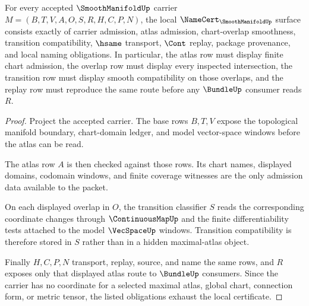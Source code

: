 \begin{theorem}
\label{thm:smoothmanifold-namecert-obligations}
For every accepted $\SmoothManifoldUp$ carrier $M=(B,T,V,A,O,S,R,H,C,P,N)$, the local $\NameCert_{\SmoothManifoldUp}$ surface consists exactly of carrier admission, atlas admission, chart-overlap smoothness, transition compatibility, $\hsame$ transport, $\Cont$ replay, package provenance, and local naming obligations. In particular, the atlas row must display finite chart admission, the overlap row must display every inspected intersection, the transition row must display smooth compatibility on those overlaps, and the replay row must reproduce the same route before any $\BundleUp$ consumer reads $R$.
\end{theorem}
\begin{proof}
Project the accepted carrier. The base rows $B,T,V$ expose the topological manifold boundary, chart-domain ledger, and model vector-space windows before the atlas can be read.

The atlas row $A$ is then checked against those rows. Its chart names, displayed domains, codomain windows, and finite coverage witnesses are the only admission data available to the packet.

On each displayed overlap in $O$, the transition classifier $S$ reads the corresponding coordinate changes through $\ContinuousMapUp$ and the finite differentiability tests attached to the model $\VecSpaceUp$ windows. Transition compatibility is therefore stored in $S$ rather than in a hidden maximal-atlas object.

Finally $H,C,P,N$ transport, replay, source, and name the same rows, and $R$ exposes only that displayed atlas route to $\BundleUp$ consumers. Since the carrier has no coordinate for a selected maximal atlas, global chart, connection form, or metric tensor, the listed obligations exhaust the local certificate.
\end{proof}

